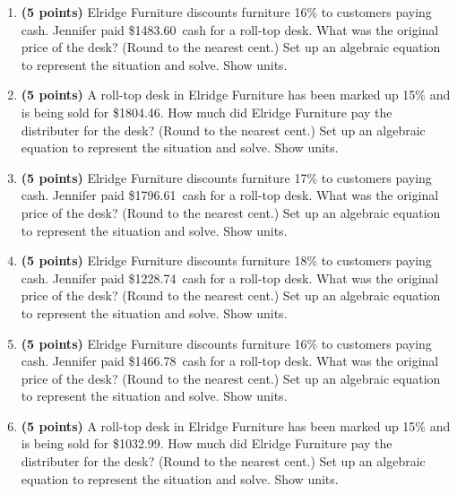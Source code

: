 \documentclass[12pt]{amsart}
\begin{document}
\begin{enumerate}
\vfill 
\def \discount{16}\def \paid{1483.60}\def \rainy{10.34}\def \orcost{1766.19}\def \purcost{1278.97}\def \orrainy{12.31}
\item {\bf (5 points)} 
 Elridge Furniture discounts furniture \discount\% to customers paying cash. Jennifer paid \$\paid\ cash for a roll-top desk. What was the original price of the desk? (Round to the nearest cent.) Set up an algebraic equation to represent the situation and solve. Show units.

\vfill 
\def \discount{15}\def \paid{1804.46}\def \rainy{13.83}\def \orcost{2122.89}\def \purcost{1569.10}\def \orrainy{16.27}
\item {\bf (5 points)} 
 A roll-top desk in Elridge Furniture has been marked up \discount\% and is being sold for \$\paid. How much did Elridge Furniture pay the distributer for the desk? (Round to the nearest cent.) Set up an algebraic equation to represent the situation and solve. Show units.

\vfill 
\def \discount{17}\def \paid{1796.61}\def \rainy{9.24}\def \orcost{2164.59}\def \purcost{1535.56}\def \orrainy{11.13}
\item {\bf (5 points)} 
 Elridge Furniture discounts furniture \discount\% to customers paying cash. Jennifer paid \$\paid\ cash for a roll-top desk. What was the original price of the desk? (Round to the nearest cent.) Set up an algebraic equation to represent the situation and solve. Show units.

\vfill 
\def \discount{18}\def \paid{1228.74}\def \rainy{14.55}\def \orcost{1498.46}\def \purcost{1041.31}\def \orrainy{17.74}
\item {\bf (5 points)} 
 Elridge Furniture discounts furniture \discount\% to customers paying cash. Jennifer paid \$\paid\ cash for a roll-top desk. What was the original price of the desk? (Round to the nearest cent.) Set up an algebraic equation to represent the situation and solve. Show units.

\vfill 
\def \discount{16}\def \paid{1466.78}\def \rainy{9.63}\def \orcost{1746.17}\def \purcost{1264.47}\def \orrainy{11.46}
\item {\bf (5 points)} 
 Elridge Furniture discounts furniture \discount\% to customers paying cash. Jennifer paid \$\paid\ cash for a roll-top desk. What was the original price of the desk? (Round to the nearest cent.) Set up an algebraic equation to represent the situation and solve. Show units.

\vfill 
\def \discount{15}\def \paid{1032.99}\def \rainy{9.90}\def \orcost{1215.28}\def \purcost{898.25}\def \orrainy{11.65}
\item {\bf (5 points)} 
 A roll-top desk in Elridge Furniture has been marked up \discount\% and is being sold for \$\paid. How much did Elridge Furniture pay the distributer for the desk? (Round to the nearest cent.) Set up an algebraic equation to represent the situation and solve. Show units.


\end{enumerate}
\end{document}
